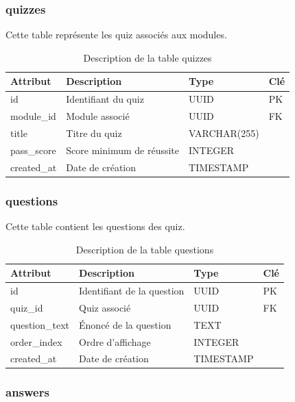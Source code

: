 \documentclass[12pt, a4paper]{report}
\begin{document}
\subsubsection{quizzes}

Cette table représente les quiz associés aux modules.

\begin{table}[H]
\centering
\caption{Description de la table quizzes}
\begin{tabularx}{\textwidth}{|p{3cm}|X|p{2.5cm}|p{1.5cm}|}
\hline
Attribut & Description & Type & Clé \\
\hline
id & Identifiant du quiz & UUID & PK \\
module\_id & Module associé & UUID & FK \\
title & Titre du quiz & VARCHAR(255) & \\
pass\_score & Score minimum de réussite & INTEGER & \\
created\_at & Date de création & TIMESTAMP & \\
\hline
\end{tabularx}
\end{table}

\subsubsection{questions}

Cette table contient les questions des quiz.

\begin{table}[H]
\centering
\caption{Description de la table questions}
\begin{tabularx}{\textwidth}{|p{3cm}|X|p{2.5cm}|p{1.5cm}|}
\hline
Attribut & Description & Type & Clé \\
\hline
id & Identifiant de la question & UUID & PK \\
quiz\_id & Quiz associé & UUID & FK \\
question\_text & Énoncé de la question & TEXT & \\
order\_index & Ordre d'affichage & INTEGER & \\
created\_at & Date de création & TIMESTAMP & \\
\hline
\end{tabularx}
\end{table}

\subsubsection{answers}
\end{document}

